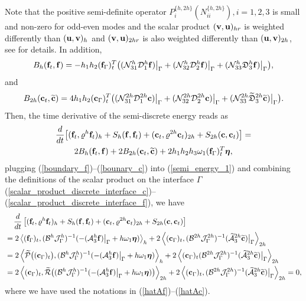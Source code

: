 Note that the positive semi-definite operator $P_i^{\{h,2h\}}(N_{ii}^{\{h,2h\}}), i = 1,2,3$ is small and non-zero for odd-even modes and the scalar product $({\bf v}, {\bf u})_{hr}$ is weighted differently than $({\bf u}, {\bf v})_h$ and $({\bf v}, {\bf u})_{2hr}$ is also weighted differently than $({\bf u}, {\bf v})_{2h}$, see \cite{sjogreen2012fourth, petersson2015wave} for details. In addition,
\begin{equation}\label{boundary_f}
B_h ({\bf f}_t,{\bf f}) = -h_1h_2({\bf f}_{\Gamma})_t^T\big((\mathcal{N}_{31}^h{\mathcal D}_1^h {\bf f})\big|_{\Gamma}+ (\mathcal{N}_{32}^h\mathcal{D}_2^h{\bf f})\big|_{\Gamma}+(\mathcal{N}_{33}^h\mathfrak{D}_3^h{\bf f})\big|_{\Gamma}\big),
\end{equation}
and
\begin{equation}\label{bounary_c}
B_{2h} ({\bf c}_t,\wt{\bf c}) = 4h_1h_2({\bf c}_{\Gamma})_t^T\big((\mathcal{N}_{31}^{2h}\mathcal{D}_1^{2h}{\bf c})\big|_{\Gamma}+ (\mathcal{N}_{32}^{2h}\mathcal{D}_2^{2h}{\bf c})\big|_{\Gamma}+(\mathcal{N}_{33}^{2h}\wt{\mathfrak{D}}_3^{2h}\wt{{\bf c}})\big|_{\Gamma}\big).
\end{equation}
Then, the time derivative of the semi-discrete energy reads as
\begin{multline}\label{semi_energy_1}
\frac{d}{dt}\big[({\bf f}_t,\varrho^h {\bf f}_t)_h + S_h({\bf f},{\bf f}_t) + ({\bf c}_t,\varrho^{2h} {\bf c}_t)_{2h} + S_{2h}({\bf c},{\bf c}_t) \big]  = \\
2B_{h}({\bf f}_t,{\bf f}) + 2B_{2h}({\bf c}_t,\wt{\bf c}) + 2h_1h_2h_3\omega_1({\bf f}_\Gamma)_t^T{\bm \eta},
\end{multline}
plugging (\ref{boundary_f})--(\ref{bounary_c}) into (\ref{semi_energy_1}) and combining the definitions of the scalar product on the interface $\Gamma$ (\ref{scalar_product_discrete_interface_c})--(\ref{scalar_product_discrete_interface_f}), we have
\begin{align*}\label{semi_energy_2}
&\hspace{0.4cm}\frac{d}{dt}\left[({\bf f}_t,\varrho^h {\bf f}_t)_{h} + S_{h}({\bf f},{\bf f}_t) + ({\bf c}_t,\varrho^{2h} {\bf c}_t)_{2h} + S_{2h}({\bf c},{\bf c}_t) \right]   \nonumber\\
& = 2\left<({\bf f}_\Gamma)_t,(\mathcal{B}^{h}\mathcal{J}^h_\Gamma)^{-1}(-(\mathcal{A}_3^h{\bf f})\big|_\Gamma+h\omega_1{\bm \eta})\right>_{h}+ 2\left<({\bf c}_\Gamma)_t,(\mathcal{B}^{2h}\mathcal{J}^{2h}_\Gamma)^{-1}(\wt{\mathcal{A}}_3^{2h}\wt{\bf c})\big|_\Gamma\right>_{2h} \nonumber\\
& = 2\left<\wt{\mathcal{P}}\big(({\bf c}_\Gamma)_t\big),(\mathcal{B}^{h}\mathcal{J}^h_\Gamma)^{-1}(-(\mathcal{A}_3^h{\bf f})\big|_\Gamma+h\omega_1{\bm \eta})\right>_{h}+ 2\left<({\bf c}_\Gamma)_t(\mathcal{B}^{2h}\mathcal{J}^{2h}_\Gamma)^{-1}(\wt{\mathcal{A}}_3^{2h}\wt{\bf c})\big|_\Gamma\right>_{2h} \nonumber\\
& = 2\left<({\bf c}_\Gamma)_t,\wt{\mathcal{R}}\big((\mathcal{B}^{h}\mathcal{J}^h_\Gamma)^{-1}(-(\mathcal{A}_3^h{\bf f})\big|_\Gamma+h\omega_1{\bm \eta})\big)\right>_{2h}+ 2\left<({\bf c}_\Gamma)_t,(\mathcal{B}^{2h}\mathcal{J}^{2h}_\Gamma)^{-1}(\wt{\mathcal{A}}_3^{2h}\wt{\bf c})\big|_\Gamma\right>_{2h} = 0,
\end{align*}
where we have used the notations in (\ref{hatAf})--(\ref{hatAc}).
